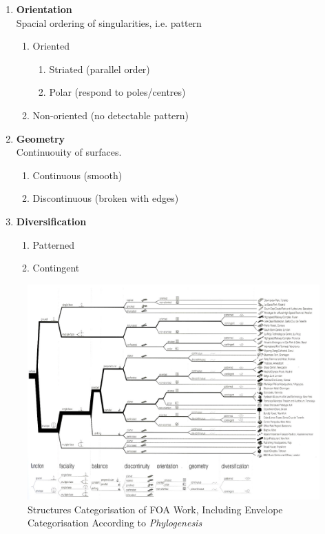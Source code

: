\begin{multicols}{2}
\begin{enumerate}
	\item \textbf{Orientation}\\
		Spacial ordering of singularities, i.e. pattern
		\begin{enumerate}
			\item Oriented
				\begin{enumerate}
					\item Striated (parallel order)
					\item Polar (respond to poles/centres)
				\end{enumerate}
			\item Non-oriented (no detectable pattern)
		\end{enumerate}
	\item \textbf{Geometry}\\
		Continuouity of surfaces.
		\begin{enumerate}
			\item Continuous (smooth)
			\item Discontinuous (broken with edges)
		\end{enumerate}
	\item \textbf{Diversification}
		\begin{enumerate}
			\item Patterned
			\item Contingent
		\end{enumerate}
\end{enumerate}
\end{multicols}

\begin{figure}
	\centering
	\includegraphics[width=20cm]{./Images/1-Phylogenesis}
	\caption[FOA Phylogenesis]{Structures Categorisation of FOA Work, Including Envelope Categorisation According to \emph{Phylogenesis} \cite{foa04}}
	\label{fig:Phylogenesis}
\end{figure}

